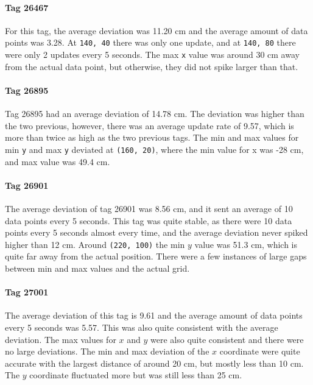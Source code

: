\paragraph{Tag 26467}
For this tag, the average deviation was 11.20 cm and the average amount of data points was 3.28.
At \texttt{140, 40} there was only one update, and at \texttt{140, 80} there were only 2 updates every 5 seconds.
The max \texttt{x} value was around 30 cm away from the actual data point, but otherwise, they did not spike larger than that.

\paragraph{Tag 26895}
Tag 26895 had an average deviation of 14.78 cm. 
The deviation was higher than the two previous, however, there was an average update rate of 9.57, which is more than twice as high as the two previous tags.
The min and max values for min \texttt{y} and max \texttt{y} deviated at \texttt{(160, 20)}, where the min value for x was -28 cm, and max value was 49.4 cm.

\paragraph{Tag 26901}
The average deviation of tag 26901 was 8.56 cm, and it sent an average of 10 data points every 5 seconds.
This tag was quite stable, as there were 10 data points every 5 seconds almost every time, and the average deviation never spiked higher than 12 cm.
Around \texttt{(220, 100)} the min $y$ value was 51.3 cm, which is quite far away from the actual position.
There were a few instances of large gaps between min and max values and the actual grid.

\paragraph{Tag 27001}
The average deviation of this tag is 9.61 and the average amount of data points every 5 seconds was 5.57.
This was also quite consistent with the average deviation. 
The max values for $x$ and $y$ were also quite consistent and there were no large deviations.
The min and max deviation of the $x$ coordinate were quite accurate with the largest distance of around 20 cm, but mostly less than 10 cm.
The $y$ coordinate fluctuated more but was still less than 25 cm.

